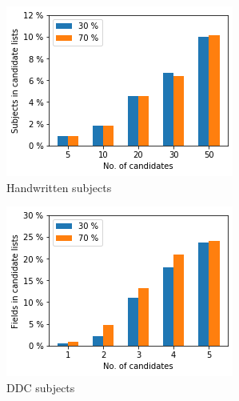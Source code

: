 \begin{figure}
  \begin{subfigure}[t]{.32\textwidth}
    \centering
    \includegraphics[width=\textwidth]{figures/supervised_approach/dropout_hw.png}
    \caption{Handwritten subjects}
    \label{fig:dropout_hw}
  \end{subfigure}
  \begin{subfigure}[t]{.32\textwidth}
    \centering
    \includegraphics[width=\textwidth]{figures/supervised_approach/dropout_ddc.png}
    \caption{DDC subjects}
    \label{fig:dropout_ddc}
  \end{subfigure}
   \begin{subfigure}[t]{.32\textwidth}
    \centering

\end{subfigure}
\end{figure}
